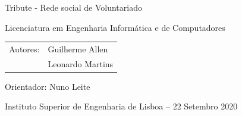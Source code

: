 \begin{frame}[t,plain]

\vspace{0.5em}

\centering
{}

\centering
{\LARGE Tribute - Rede social de Voluntariado}

\vspace{0.5em}

Licenciatura em Engenharia Informática e de Computadores

\vspace{0.5em}	

\begin{tabular}{rl}
	Autores: & Guilherme Allen \\
	             & Leonardo Martins
\end{tabular}

\vspace{0.5em}

Orientador:  Nuno Leite 

\vspace{0.5em}

Instituto Superior de Engenharia de Lisboa -- 22 Setembro 2020

\end{frame}